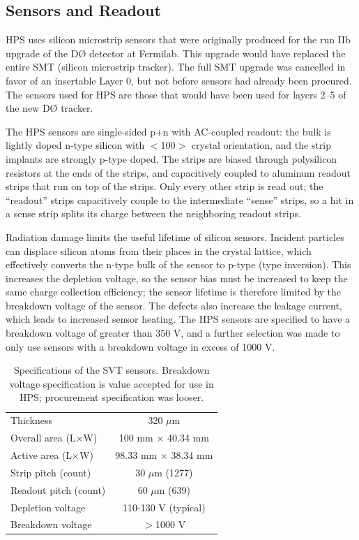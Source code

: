 \subsection{Sensors and Readout}
HPS uses silicon microstrip sensors that were originally produced for the run IIb upgrade of the D{\O} detector at Fermilab.
This upgrade would have replaced the entire SMT (silicon microstrip tracker).
The full SMT upgrade was cancelled in favor of an insertable Layer 0, but not before sensors had already been procured.
The sensors used for HPS are those that would have been used for layers 2--5 of the new D{\O} tracker.

The HPS sensors are single-sided p+n with AC-coupled readout: the bulk is lightly doped n-type silicon with $<$100$>$ crystal orientation, and the strip implants are strongly p-type doped.
The strips are biased through polysilicon resistors at the ends of the strips, and capacitively coupled to aluminum readout strips that run on top of the strips.
Only every other strip is read out; the ``readout'' strips capacitively couple to the intermediate ``sense'' strips, so a hit in a sense strip splits its charge between the neighboring readout strips.

Radiation damage limits the useful lifetime of silicon sensors.
Incident particles can displace silicon atoms from their places in the crystal lattice, which effectively converts the n-type bulk of the sensor to p-type (type inversion).
This increases the depletion voltage, so the sensor bias must be increased to keep the same charge collection efficiency; the sensor lifetime is therefore limited by the breakdown voltage of the sensor.
The defects also increase the leakage current, which leads to increased sensor heating.
The HPS sensors are specified to have a breakdown voltage of greater than 350 V, and a further selection was made to only use sensors with a breakdown voltage in excess of 1000 V.

\begin{table}[ht]
    \begin{center}
        \caption{Specifications of the SVT sensors.
        Breakdown voltage specification is value accepted for use in HPS; procurement specification was looser.}
        \begin{tabular}{lc}   
            \hline \hline
            Thickness & 320 $\mu$m \\
            Overall area (L$\times$W) & 100 mm $\times$ 40.34 mm\\
            Active area (L$\times$W) & 98.33 mm $\times$ 38.34 mm\\
            Strip pitch (count) & 30 $\mu$m (1277)\\
            Readout pitch (count) & 60 $\mu$m (639)\\
            Depletion voltage & 110-130 V (typical)\\
            Breakdown voltage & $>$1000 V\\
            \hline \hline
        \end{tabular}
        \label{tab:sensor_spec} 
    \end{center}
\end{table}

